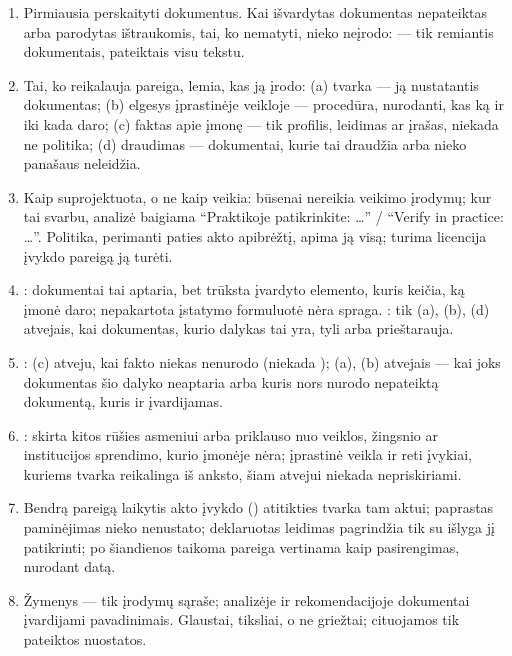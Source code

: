\begin{enumerate}[itemsep=1pt, topsep=3pt]
  \item Pirmiausia perskaityti dokumentus. Kai išvardytas dokumentas nepateiktas arba
    parodytas ištraukomis, tai, ko nematyti, nieko neįrodo:  --- tik remiantis
    dokumentais, pateiktais visu tekstu.
  \item Tai, ko reikalauja pareiga, lemia, kas ją įrodo: (a) tvarka --- ją nustatantis
    dokumentas; (b) elgesys įprastinėje veikloje --- procedūra, nurodanti, kas ką ir iki kada
    daro; (c) faktas apie įmonę --- tik profilis, leidimas ar įrašas, niekada ne politika;
    (d) draudimas --- dokumentai, kurie tai draudžia arba nieko panašaus neleidžia.
  \item Kaip suprojektuota, o ne kaip veikia: būsenai  nereikia veikimo įrodymų; kur tai
    svarbu, analizė baigiama \enquote{Praktikoje patikrinkite: …} / \enquote{Verify in practice:
    …}. Politika, perimanti paties akto apibrėžtį, apima ją visą; turima licencija įvykdo
    pareigą ją turėti.
  \item {}: dokumentai tai aptaria, bet trūksta įvardyto elemento, kuris keičia, ką
    įmonė daro; nepakartota įstatymo formuluotė nėra spraga. : tik (a), (b), (d)
    atvejais, kai dokumentas, kurio dalykas tai yra, tyli arba prieštarauja.
  \item {}: (c) atveju, kai fakto niekas nenurodo (niekada ); (a), (b)
    atvejais --- kai joks dokumentas šio dalyko neaptaria arba kuris nors nurodo nepateiktą
    dokumentą, kuris ir įvardijamas.
  \item {}: skirta kitos rūšies asmeniui arba priklauso nuo veiklos, žingsnio
    ar institucijos sprendimo, kurio įmonėje nėra; įprastinė veikla ir reti įvykiai, kuriems
    tvarka reikalinga iš anksto, šiam atvejui niekada nepriskiriami.
  \item Bendrą pareigą laikytis akto įvykdo () atitikties tvarka tam aktui; paprastas
    paminėjimas nieko nenustato; deklaruotas leidimas pagrindžia  tik su išlyga jį
    patikrinti; po šiandienos taikoma pareiga vertinama kaip pasirengimas, nurodant datą.
  \item Žymenys --- tik įrodymų sąraše; analizėje ir rekomendacijoje dokumentai įvardijami
    pavadinimais. Glaustai, tiksliai, o ne griežtai; cituojamos tik pateiktos nuostatos.
\end{enumerate}

